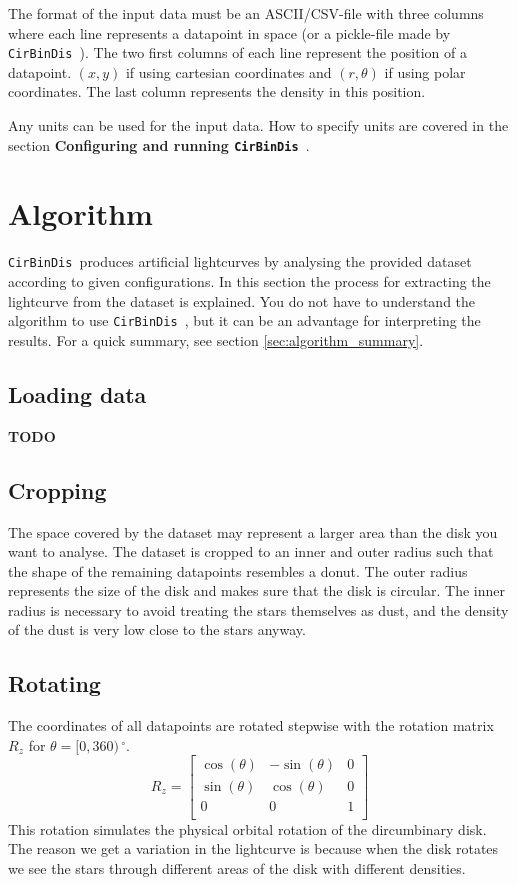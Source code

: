 \documentclass[a4paper, 12pt, english, titlepage]{article}
\newcommand{\degree}{\, ^\circ}    %
\newcommand{\sname}{\texttt{CirBinDis }}
\begin{document}
The format of the input data must be an ASCII/CSV-file with three columns where each line represents a datapoint in space (or a pickle-file made by \sname). The two first columns of each line represent the position of a datapoint. $(x, y)$ if using cartesian coordinates and $(r, \theta)$ if using polar coordinates. The last column represents the density in this position.

Any units can be used for the input data. How to specify units are covered in the section \textbf{Configuring and running \sname}.


\section{Algorithm}

\sname produces artificial lightcurves by analysing the provided dataset according to given configurations. In this section the process for extracting the lightcurve from the dataset is explained. You do not have to understand the algorithm to use \sname, but it can be an advantage for interpreting the results. For a quick summary, see section \vref{sec:algorithm_summary}.

\subsection{Loading data}
    \textbf{TODO}

\subsection{Cropping}
    The space covered by the dataset may represent a larger area than the disk you want to analyse. The dataset is cropped to an inner and outer radius such that the shape of the remaining datapoints resembles a donut. The outer radius represents the size of the disk and makes sure that the disk is circular. The inner radius is necessary to avoid treating the stars themselves as dust, and the density of the dust is very low close to the stars anyway.

\subsection{Rotating}
    \label{sec:rotating}
    The coordinates of all datapoints are rotated stepwise with the rotation
    matrix $R_z$ for $\theta = [0, 360)\degree$.
    $$
    R_z = \begin{bmatrix}
        \cos(\theta) & -\sin(\theta) &              0 \\
        \sin(\theta) &  \cos(\theta) &              0 \\
                   0 &             0 &              1 \\
    \end{bmatrix}
    $$
    This rotation simulates the physical orbital rotation of the dircumbinary
    disk. The reason we get a variation in the lightcurve is because when the
    disk rotates we see the stars through different areas of the disk with
    different densities.
\end{document}
